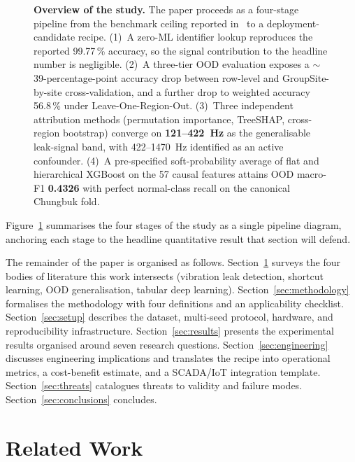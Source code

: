 \documentclass[3p,times,authoryear]{elsarticle}
\theoremstyle{remark}
\begin{document}
\begin{figure}[!htbp]
\centering
\resizebox{0.95\textwidth}{!}{}
\caption{\textbf{Overview of the study.} The paper proceeds as a
four-stage pipeline from the benchmark ceiling reported
in~\cite{lee2023leak} to a deployment-candidate recipe.
(1)~A zero-ML identifier lookup reproduces the reported 99.77\,\%
accuracy, so the signal contribution to the headline number is
negligible.
(2)~A three-tier OOD evaluation exposes a $\sim$39-percentage-point
accuracy drop between row-level and GroupSite-by-site
cross-validation, and a further drop to weighted accuracy
56.8\,\% under Leave-One-Region-Out.
(3)~Three independent attribution methods (permutation importance,
TreeSHAP, cross-region bootstrap) converge on \textbf{121--422~Hz}
as the generalisable leak-signal band, with 422--1470~Hz identified
as an active confounder.
(4)~A pre-specified soft-probability average of flat and
hierarchical XGBoost on the 57 causal features attains OOD
macro-F1 \textbf{0.4326} with perfect normal-class recall on the
canonical Chungbuk fold.\label{fig:overview}}
\end{figure}

Figure~\ref{fig:overview} summarises the four stages of the
study as a single pipeline diagram, anchoring each stage to
the headline quantitative result that section will defend.

The remainder of the paper is organised as follows.
Section~\ref{sec:related} surveys the four bodies of literature
this work intersects (vibration leak detection, shortcut learning,
OOD generalisation, tabular deep learning). Section~\ref{sec:methodology}
formalises the methodology with four definitions and an
applicability checklist. Section~\ref{sec:setup} describes the
dataset, multi-seed protocol, hardware, and reproducibility
infrastructure. Section~\ref{sec:results} presents the
experimental results organised around seven research questions.
Section~\ref{sec:engineering} discusses engineering implications
and translates the recipe into operational metrics, a
cost-benefit estimate, and a SCADA/IoT integration template.
Section~\ref{sec:threats} catalogues threats to validity and
failure modes. Section~\ref{sec:conclusions} concludes.

\section{Related Work}\label{sec:related}
\end{document}
